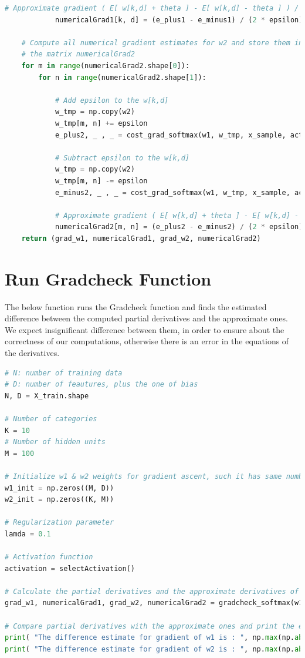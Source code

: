 \documentclass[11pt]{article}
\begin{document}
\begin{lstlisting}[language = Python]
            # Approximate gradient ( E[ w[k,d] + theta ] - E[ w[k,d] - theta ] ) / 2*e
            numericalGrad1[k, d] = (e_plus1 - e_minus1) / (2 * epsilon)
    
    # Compute all numerical gradient estimates for w2 and store them in
    # the matrix numericalGrad2
    for m in range(numericalGrad2.shape[0]):
        for n in range(numericalGrad2.shape[1]):
            
            # Add epsilon to the w[k,d]
            w_tmp = np.copy(w2)
            w_tmp[m, n] += epsilon
            e_plus2, _ , _ = cost_grad_softmax(w1, w_tmp, x_sample, activation, t_sample, lamda)

            # Subtract epsilon to the w[k,d]
            w_tmp = np.copy(w2)
            w_tmp[m, n] -= epsilon
            e_minus2, _ , _ = cost_grad_softmax(w1, w_tmp, x_sample, activation, t_sample, lamda)
            
            # Approximate gradient ( E[ w[k,d] + theta ] - E[ w[k,d] - theta ] ) / 2*e
            numericalGrad2[m, n] = (e_plus2 - e_minus2) / (2 * epsilon)
    return (grad_w1, numericalGrad1, grad_w2, numericalGrad2)
\end{lstlisting}
\newpage

\section{Run Gradcheck Function}
The below function runs the Gradcheck function and finds the estimated difference between the computed partial derivatives and the approximate ones. We expect insignificant difference between them, in order to ensure about the correctness of our computations, otherwise there is an error in the equations of the derivatives. \\


\begin{lstlisting}[language = Python]
# N: number of training data
# D: number of feautures, plus the one of bias
N, D = X_train.shape

# Number of categories
K = 10 
# Number of hidden units
M = 100 

# Initialize w1 & w2 weights for gradient ascent, such it has same number of columns as our input features
w1_init = np.zeros((M, D))
w2_init = np.zeros((K, M))

# Regularization parameter
lamda = 0.1

# Activation function
activation = selectActivation()

# Calculate the partial derivatives and the approximate derivatives of the weights w1 & w2
grad_w1, numericalGrad1, grad_w2, numericalGrad2 = gradcheck_softmax(w1_init, w2_init, X_train, y_train, lamda, activation)

# Compare partial derivatives with the approximate ones and print the estimated difference
print( "The difference estimate for gradient of w1 is : ", np.max(np.abs(grad_w1 - numericalGrad1)) )
print( "The difference estimate for gradient of w2 is : ", np.max(np.abs(grad_w2 - numericalGrad2)) )
\end{lstlisting}
\end{document}
